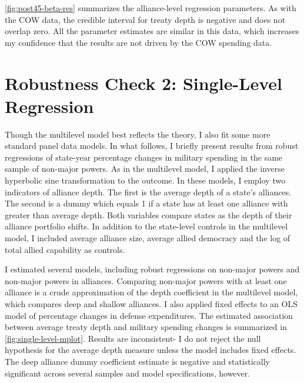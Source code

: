 \documentclass[12pt]{article}
\begin{document}
\autoref{fig:post45-beta-res} summarizes the alliance-level regression parameters. 
As with the COW data, the credible interval for treaty depth is negative and does not overlap zero. 
All the parameter estimates are similar in this data, which increases my confidence that the results are not driven by the COW spending data. 

 


\section{Robustness Check 2: Single-Level Regression}


Though the multilevel model best reflects the theory, I also fit some more standard panel data models. 
In what follows, I briefly present results from robust regressions of state-year percentage changes in military spending in the same sample of non-major powers. 
As in the multilevel model, I applied the inverse hyperbolic sine transformation to the outcome. 
In these models, I employ two indicators of alliance depth. 
The first is the average depth of a state's alliances. 
The second is a dummy which equals 1 if a state has at least one alliance with greater than average depth. 
Both variables compare states as the depth of their alliance portfolio shifts. 
In addition to the state-level controls in the multilevel model, I included average alliance size, average allied democracy and the log of total allied capability as controls. 


I estimated several models, including robust regressions on non-major powers and non-major powers in alliances. 
Comparing non-major powers with at least one alliance is a crude approximation of the depth coefficient in the multilevel model, which compares deep and shallow alliances. 
I also applied fixed effects to an OLS model of percentage changes in defense expenditures. 
The estimated association between average treaty depth and military spending changes is summarized in \autoref{fig:single-level-mplot}. 
Results are inconsistent- I do not reject the null hypothesis for the average depth measure unless the model includes fixed effects. 
The deep alliance dummy coefficient estimate is negative and statistically significant across several samples and model specifications, however. 
\end{document}
